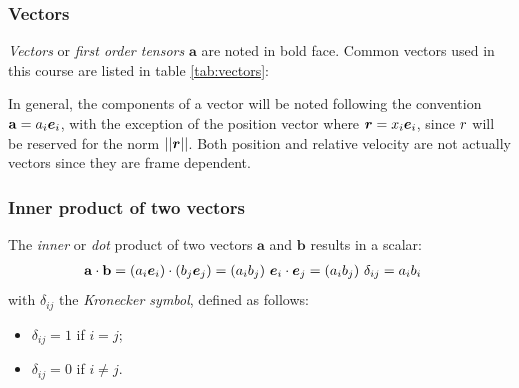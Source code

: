 \subsubsection{Vectors} 

\emph{Vectors} or \emph{first order tensors} $\mathbf a$ are noted in
bold face. Common vectors used in this course are listed in table
\ref{tab:vectors}:
\begin{table}[H]
  \caption{Common vector quantities}
  \label{tab:vectors}
\end{table}
In general, the components of a vector will be noted following the
convention $\mathbf a = a_i \boldsymbol e_{i}$, with the exception of the
position vector where $\boldsymbol {r} = x_i \boldsymbol e_{i}$, since $r$ will be
reserved for the norm $||\boldsymbol {r}||$. Both position and relative velocity
are not actually vectors since they are frame dependent.

\subsubsection{Inner product of two vectors}
  
The \emph{inner} or \emph{dot} product of two vectors $\mathbf a$ and
$\mathbf b$ results in a scalar:
\begin{align*}
  \mathbf a \cdot \mathbf b 
  &= \left(a_i \boldsymbol e_{i}\right) \cdot \left(b_j \boldsymbol e_{j}\right) 
  = (a_i b_j) ~\boldsymbol e_{i} \cdot \boldsymbol e_{j} 
  = (a_i b_j) ~\delta_{ij} 
  = a_i b_i
\end{align*}
with $\delta_{ij}$ the \emph{Kronecker symbol}, defined as follows:
\begin{itemize}
\item $\delta_{ij} = 1$ if $i=j$;
\item $\delta_{ij}=0$ if $i\neq j$.
\end{itemize}

